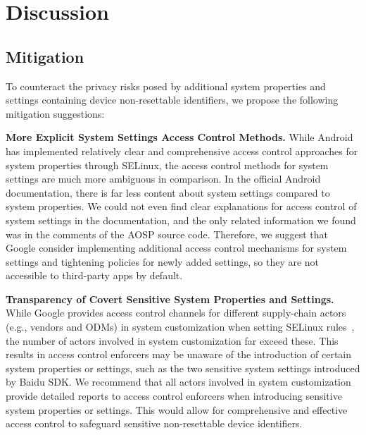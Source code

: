\section{Discussion}
\label{sec:discussion}

\subsection{Mitigation}
To counteract the privacy risks posed by additional system properties and settings containing device non-resettable identifiers, we propose the following mitigation suggestions:

\noindent \textbf{More Explicit System Settings Access Control Methods.}
While Android has implemented relatively clear and comprehensive access control approaches for system properties through SELinux, the access control methods for system settings are much more ambiguous in comparison.
In the official Android documentation, there is far less content about system settings compared to system properties. 
We could not even find clear explanations for access control of system settings in the documentation, and the only related information we found was in the comments of the AOSP source code.
Therefore, we suggest that Google consider implementing additional access control mechanisms for system settings and tightening policies for newly added settings, so they are not accessible to third-party apps by default.

\noindent \textbf{Transparency of Covert Sensitive System Properties and Settings.}
While Google provides access control channels for different supply-chain actors (e.g., vendors and ODMs) in system customization when setting SELinux rules~\cite{vendorprop}, the number of actors involved in system customization far exceed these.
This results in access control enforcers may be unaware of the introduction of certain system properties or settings, such as the two sensitive system settings introduced by Baidu SDK.
We recommend that all actors involved in system customization provide detailed reports to access control enforcers when introducing sensitive system properties or settings. 
This would allow for comprehensive and effective access control to safeguard sensitive non-resettable device identifiers.

